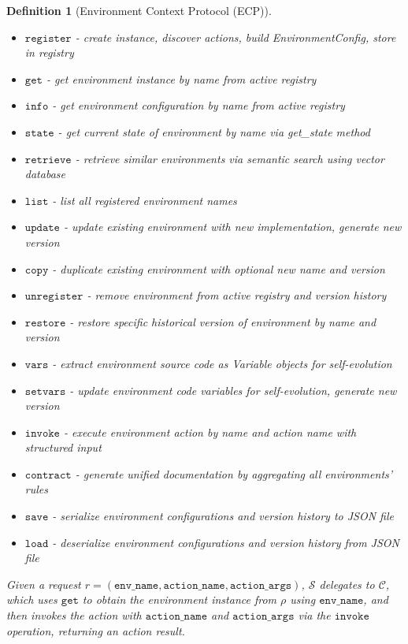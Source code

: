\documentclass[11pt]{article}
\newtheorem{definition}{Definition}
\begin{document}
\begin{definition}[Environment Context Protocol (ECP)]
\begin{itemize}[leftmargin=*,itemsep=0.1em]
\begin{itemize}[leftmargin=*,itemsep=0.05em]
      \item $\mathtt{register}$ - create instance, discover actions, build EnvironmentConfig, store in registry
      \item $\mathtt{get}$ - get environment instance by name from active registry
      \item $\mathtt{info}$ - get environment configuration by name from active registry
      \item $\mathtt{state}$ - get current state of environment by name via get\_state method
      \item $\mathtt{retrieve}$ - retrieve similar environments via semantic search using vector database
      \item $\mathtt{list}$ - list all registered environment names
      \item $\mathtt{update}$ - update existing environment with new implementation, generate new version
      \item $\mathtt{copy}$ - duplicate existing environment with optional new name and version
      \item $\mathtt{unregister}$ - remove environment from active registry and version history
      \item $\mathtt{restore}$ - restore specific historical version of environment by name and version
      \item $\mathtt{vars}$ - extract environment source code as Variable objects for self-evolution
      \item $\mathtt{setvars}$ - update environment code variables for self-evolution, generate new version
      \item $\mathtt{invoke}$ - execute environment action by name and action name with structured input
      \item $\mathtt{contract}$ - generate unified documentation by aggregating all environments' rules
      \item $\mathtt{save}$ - serialize environment configurations and version history to JSON file
      \item $\mathtt{load}$ - deserialize environment configurations and version history from JSON file
    \end{itemize}
\end{itemize}
  Given a request $r = (\mathtt{env\_name}, \mathtt{action\_name}, \mathtt{action\_args})$, $\mathcal{S}$ delegates to $\mathcal{C}$, which uses $\mathtt{get}$ to obtain the environment instance from $\rho$ using $\mathtt{env\_name}$, and then invokes the action with $\mathtt{action\_name}$ and $\mathtt{action\_args}$ via the $\mathtt{invoke}$ operation, returning an action result.
\end{definition}
\end{document}
